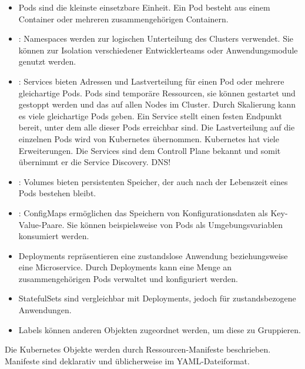 \begin{itemize}
\item Pods sind die kleinste einsetzbare Einheit. Ein Pod besteht aus einem Container oder mehreren zusammengehörigen Containern.
\item: Namespaces werden zur logischen Unterteilung des Clusters verwendet. Sie können zur Isolation verschiedener Entwicklerteams oder Anwendungsmodule genutzt werden.
\item: Services bieten Adressen und Lastverteilung für einen Pod oder mehrere gleichartige Pods. Pods sind temporäre Ressourcen, sie können gestartet und gestoppt werden und das auf allen Nodes im Cluster. Durch Skalierung kann es viele gleichartige Pods geben. Ein Service stellt einen festen Endpunkt bereit, unter dem alle dieser Pods erreichbar sind. Die Lastverteilung auf die einzelnen Pods wird von Kubernetes übernommen. Kubernetes hat viele Erweiterungen. Die Services sind dem Controll Plane bekannt und somit übernimmt er die Service Discovery. DNS!
\item: Volumes bieten persistenten Speicher, der auch nach der Lebenszeit eines Pods bestehen bleibt.
\item: ConfigMaps ermöglichen das Speichern von Konfigurationsdaten als Key-Value-Paare. Sie können beispielsweise von Pods als Umgebungsvariablen konsumiert werden.
\item Deployments repräsentieren eine zustandslose Anwendung beziehungsweise eine Microservice. Durch Deployments kann eine Menge an zusammengehörigen Pods verwaltet und konfiguriert werden. 
\item StatefulSets sind vergleichbar mit Deployments, jedoch für zustandsbezogene Anwendungen.
\item Labels können anderen Objekten zugeordnet werden, um diese zu Gruppieren.
\end{itemize}

Die Kubernetes Objekte werden durch Ressourcen-Manifeste beschrieben. Manifeste
sind deklarativ und üblicherweise im YAML-Dateiformat.

%
%
%
%
%
%
%

